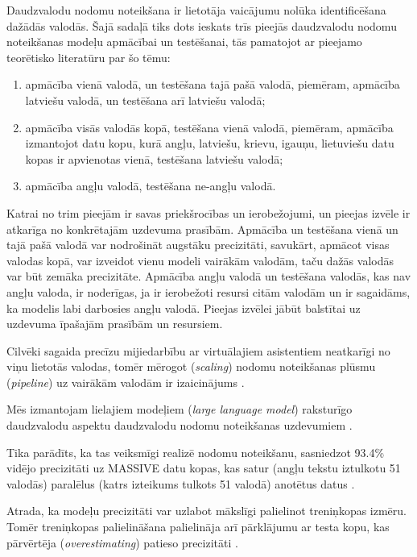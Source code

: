 Daudzvalodu nodomu noteikšana ir lietotāja vaicājumu nolūka identificēšana dažādās valodās. Šajā sadaļā tiks dots ieskats trīs pieejās daudzvalodu nodomu noteikšanas modeļu apmācībai un testēšanai, tās pamatojot ar pieejamo teorētisko literatūru par šo tēmu:
\begin{enumerate}
	\item apmācība vienā valodā, un testēšana tajā pašā valodā, piemēram, apmācība latviešu valodā, un testēšana arī latviešu valodā;
	\item apmācība visās valodās kopā, testēšana vienā valodā, piemēram, apmācība izmantojot datu kopu, kurā angļu, latviešu, krievu, igauņu, lietuviešu datu kopas ir apvienotas vienā, testēšana latviešu valodā;
	\item apmācība angļu valodā, testēšana ne-angļu valodā.
\end{enumerate}

Katrai no trim pieejām ir savas priekšrocības un ierobežojumi, un pieejas izvēle ir atkarīga no konkrētajām uzdevuma prasībām. Apmācība un testēšana vienā un tajā pašā valodā var nodrošināt augstāku precizitāti, savukārt, apmācot visas valodas kopā, var izveidot vienu modeli vairākām valodām, taču dažās valodās var būt zemāka precizitāte. Apmācība angļu valodā un testēšana valodās, kas nav angļu valoda, ir noderīgas, ja ir ierobežoti resursi citām valodām un ir sagaidāms, ka modelis labi darbosies angļu valodā. Pieejas izvēlei jābūt balstītai uz uzdevuma īpašajām prasībām un resursiem.



Cilvēki sagaida precīzu mijiedarbību ar virtuālajiem asistentiem neatkarīgi no viņu lietotās valodas, tomēr mērogot (\textit{scaling}) nodomu noteikšanas plūsmu (\textit{pipeline}) uz vairākām valodām ir izaicinājums \cite{de-bruyn-2022}. 



Mēs izmantojam lielajiem modeļiem (\textit{large language model}) raksturīgo daudzvalodu aspektu daudzvalodu nodomu noteikšanas uzdevumiem \cite{de-bruyn-2022}.




Tika parādīts, ka tas veiksmīgi realizē nodomu noteikšanu, sasniedzot 93.4\% vidējo precizitāti uz MASSIVE datu kopas, kas satur (angļu tekstu iztulkotu 51 valodās) paralēlus (katrs izteikums tulkots 51 valodā) anotētus datus \cite{de-bruyn-2022}.



Atrada, ka modeļu precizitāti var uzlabot mākslīgi palielinot treniņkopas izmēru. Tomēr treniņkopas palielināšana palielināja arī pārklājumu ar testa kopu, kas pārvērtēja (\textit{overestimating}) patieso precizitāti \cite{de-bruyn-2022}.




